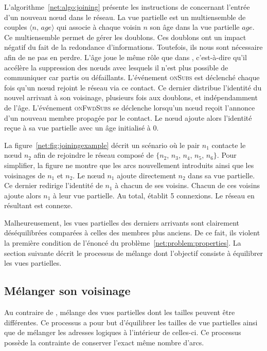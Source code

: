 L'algorithme~\ref{net:algo:joining} présente les instructions de \SPRAY
concernant l'entrée d'un nouveau nœud dans le réseau. La vue partielle est un
multiensemble de couples $\langle n,\, age\rangle$ qui associe à chaque voisin
$n$ son âge dans la vue partielle $age$. Ce multiensemble permet de gérer les
doublons. Ces doublons ont un impact négatif du fait de la redondance
d'informations.  Toutefois, ils nous sont nécessaire afin de ne pas en
perdre. L'âge joue le même rôle que dans \CYCLON, c'est-à-dire qu'il accélère la
suppression des nœuds avec lesquels il n'est plus possible de communiquer car
partis ou défaillants. L'événement \textsc{onSubs} est déclenché chaque fois
qu'un nœud rejoint le réseau via ce contact. Ce dernier distribue l'identité du
nouvel arrivant à son voisinage, plusieurs fois aux doublons, et indépendamment
de l'âge. L'événement \textsc{onFwdSubs} se déclenche lorsqu'un nœud reçoit
l'annonce d'un nouveau membre propagée par le contact. Le nœud ajoute alors
l'identité reçue à sa vue partielle avec un âge initialisé à $0$.

La figure~\ref{net:fig:joiningexample} décrit un scénario où le pair $n_1$
contacte le nœud $n_2$ afin de rejoindre le réseau composé de $\{n_2$, $n_3$,
$n_4$, $n_5$, $n_6\}$. Pour simplifier, la figure ne montre que les arcs
nouvellement introduits ainsi que les voisinages de $n_1$ et $n_2$. Le nœud
$n_1$ ajoute directement $n_2$ dans sa vue partielle. Ce dernier redirige
l'identité de $n_1$ à chacun de ses voisins.  Chacun de ces voisins ajoute alors
$n_1$ à leur vue partielle. Au total, \SPRAY établit 5 connexions. Le réseau en
résultant est connexe.

Malheureusement, les vues partielles des derniers arrivants sont clairement
déséquilibrées comparées à celles des membres plus anciens. De ce fait, ils
violent la première condition de l'énoncé du
problème~\ref{net:problem:properties}. La section suivante décrit le processus
de mélange dont l'objectif consiste à équilibrer les vues partielles.

\subsection{Mélanger son voisinage}
\label{net:subsec:shuffling}

Au contraire de \CYCLON, \SPRAY mélange des vues partielles dont les tailles
peuvent être différentes. Ce processus a pour but d'équilibrer les tailles de
vue partielles ainsi que de mélanger les adresses logiques à l'intérieur de
celles-ci.  Ce processus possède la contrainte de conserver l'exact même nombre
d'arcs.

